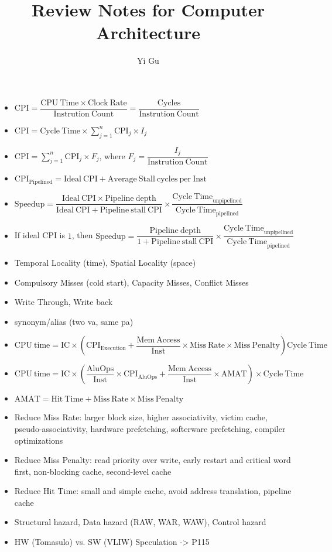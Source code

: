 \documentclass{article}
\title{Review Notes for Computer Architecture}
\author{Yi Gu}
\def\l{\left}
\def\r{\right}
\begin{document}
    \maketitle
    \begin{itemize}
        \item $\mathrm{CPI} = \dfrac{\mathrm{CPU~Time} \times \mathrm{Clock~Rate}}{{\mathrm{Instrution~Count}}} = \dfrac{\mathrm{Cycles}}{\mathrm{Instrution~Count}}$
        \item $\mathrm{CPI} = \mathrm{Cycle~Time} \times \sum\limits_{j = 1}^n \mathrm{CPI}_j \times I_j$
        \item $\mathrm{CPI} = \sum\limits_{j = 1}^n \mathrm{CPI}_j \times F_j$, where $F_j = \dfrac{I_j}{\mathrm{Instrution~Count}}$
        \item $\mathrm{CPI}_\mathrm{Pipelined} = \mathrm{Ideal~CPI} + \mathrm{Average~Stall~cycles~per~Inst}$
        \item $\mathrm{Speedup} = \dfrac{\mathrm{Ideal~CPI} \times \mathrm{Pipeline~depth}}{\mathrm{Ideal~CPI} + \mathrm{Pipeline~stall~CPI}} \times \dfrac{\mathrm{Cycle~Time}_\mathrm{unpipelined}}{\mathrm{Cycle~Time}_\mathrm{pipelined}}$
        \item If ideal CPI is $1$, then $\mathrm{Speedup} = \dfrac{\mathrm{Pipeline~depth}}{1 + \mathrm{Pipeline~stall~CPI}} \times \dfrac{\mathrm{Cycle~Time}_\mathrm{unpipelined}}{\mathrm{Cycle~Time}_\mathrm{pipelined}}$
        \item Temporal Locality (time), Spatial Locality (space)
        \item Compulsory Misses (cold start), Capacity Misses, Conflict Misses
        \item Write Through, Write back
        \item synonym/alias (two va, same pa)
        \item $\mathrm{CPU~time} = \mathrm{IC} \times \l( \mathrm{CPI}_\mathrm{Execution} + \dfrac{\mathrm{Mem~Access}}{\mathrm{Inst}} \times \mathrm{Miss~Rate} \times \mathrm{Miss~Penalty} \r) \mathrm{Cycle~Time}$
        \item $\mathrm{CPU~time} = \mathrm{IC} \times \l( \dfrac{\mathrm{AluOps}}{\mathrm{Inst}} \times \mathrm{CPI}_\mathrm{AluOps} + \dfrac{\mathrm{Mem~Access}}{\mathrm{Inst}} \times \mathrm{AMAT} \r) \times \mathrm{Cycle~Time}$
        \item $\mathrm{AMAT} = \mathrm{Hit~Time} + \mathrm{Miss~Rate} \times \mathrm{Miss~Penalty}$
        \item Reduce Miss Rate: larger block size, higher associativity, victim cache, pseudo-associativity, hardware prefetching, softerware prefetching, compiler optimizations
        \item Reduce Miss Penalty: read priority over write, early restart and critical word first, non-blocking cache, second-level cache
        \item Reduce Hit Time: small and simple cache, avoid address translation, pipeline cache
        \item Structural hazard, Data hazard (RAW, WAR, WAW), Control hazard
        \item HW (Tomasulo) vs. SW (VLIW) Speculation -> P115
    \end{itemize}
\end{document}
